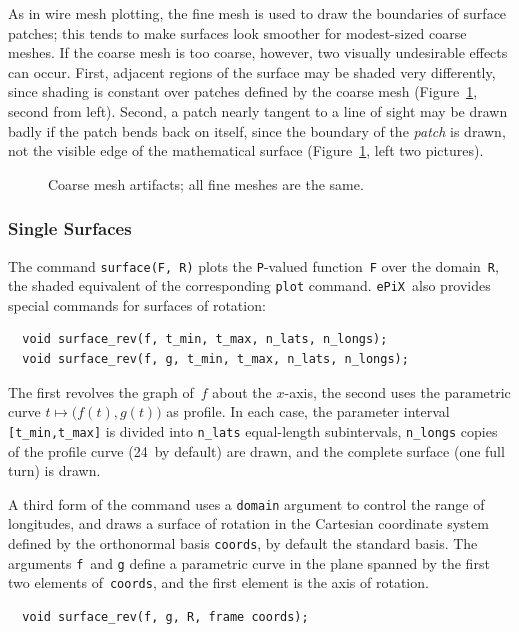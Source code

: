 \documentclass[12pt]{report}
\newcommand{\code}[1]{\texttt{#1}}
\newcommand{\ePiX}{\code{ePiX}}
\begin{document}
As in wire mesh plotting, the fine mesh is used to draw the boundaries
of surface patches; this tends to make surfaces look smoother for
modest-sized coarse meshes. If the coarse mesh is too coarse, however,
two visually undesirable effects can occur. First, adjacent regions of
the surface may be shaded very differently, since shading is constant
over patches defined by the coarse mesh (Figure~\ref{fig:patches},
second from left). Second, a patch nearly tangent to a line of sight
may be drawn badly if the patch bends back on itself, since the
boundary of the \emph{patch} is drawn, not the visible edge of the
mathematical surface (Figure~\ref{fig:patches}, left two pictures).
\begin{figure}[hbt]
  \begin{center}
    \hfil
    \hfil
    \hfil
    
  \end{center}
  \caption{Coarse mesh artifacts; all fine meshes are the same.}
  \label{fig:patches}
\end{figure}


\subsubsection*{Single Surfaces}

The command \code{surface(F, R)} plots the \code{P}-valued
function~\code{F} over the domain~\code{R}, the shaded equivalent of
the corresponding \code{plot} command. \ePiX\ also provides special
commands for surfaces of rotation:
\begin{verbatim}
  void surface_rev(f, t_min, t_max, n_lats, n_longs);
  void surface_rev(f, g, t_min, t_max, n_lats, n_longs);
\end{verbatim}
The first revolves the graph of~$f$ about the $x$-axis, the second
uses the parametric curve $t\mapsto\bigl(f(t),g(t)\bigr)$ as
profile. In each case, the parameter interval \verb+[t_min,t_max]+ is
divided into \verb+n_lats+ equal-length subintervals, \verb+n_longs+
copies of the profile curve (24~by default) are drawn, and the
complete surface (one full turn) is drawn.

A third form of the command uses a \code{domain} argument to control
the range of longitudes, and draws a surface of rotation in the
Cartesian coordinate system defined by the orthonormal basis
\code{coords}, by default the standard basis. The arguments
\code{f}~and \code{g} define a parametric curve in the plane spanned
by the first two elements of~\code{coords}, and the first element is
the axis of rotation.
\begin{verbatim}
  void surface_rev(f, g, R, frame coords);
\end{verbatim}
\end{document}
